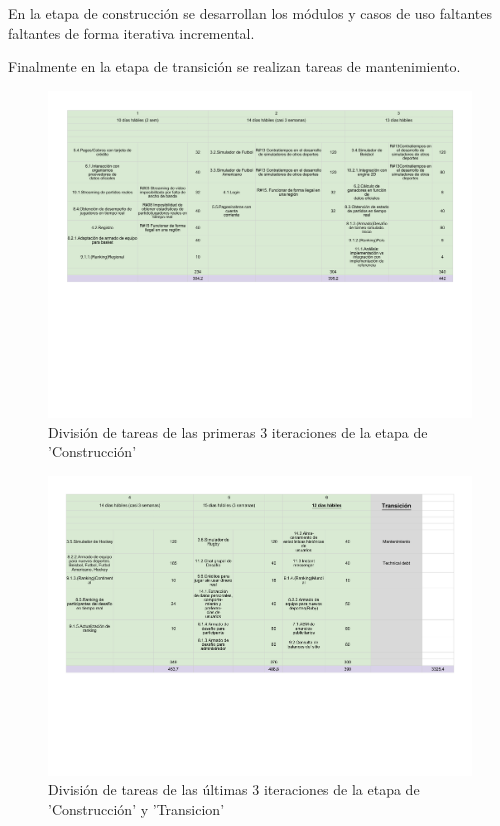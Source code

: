En la etapa de construcción se desarrollan los módulos y casos de uso faltantes faltantes de forma iterativa incremental. 

Finalmente en la etapa de transición se realizan tareas de mantenimiento.

\newpage
\begin{landscape}

\begin{figure}[h!]
   \includegraphics[scale=0.8]{imagenes/construccion123.pdf}
   \caption{División de tareas de las primeras 3 iteraciones de la etapa de 'Construcción'}
\end{figure}

\end{landscape}
\newpage

\newpage
\begin{landscape}

\begin{figure}[h!]
   \includegraphics[scale=0.8]{imagenes/construccion-transicion.pdf}
   \caption{División de tareas de las últimas 3 iteraciones de la etapa de 'Construcción' y 'Transicion'}
\end{figure}

\end{landscape}
\newpage



